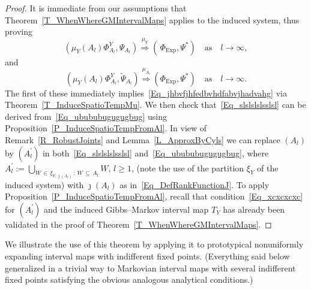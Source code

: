 \documentclass[AHL,Unicode,longabstracts]{cedram}
\newcommand{\Expl}{\mathrm{Exp}}
\begin{document}
\begin{proof}
It is immediate from our assumptions that Theorem~\ref{T_WhenWhereGMIntervalMaps} applies to the induced system, thus proving
\begin{equation}
\left(\mu_{Y}(A_{l})\Phi_{A_{l}}^{Y},\Psi_{A_{l}}\right)\overset{\mu_{Y}}{\Longrightarrow }\left(\,\Phi_{\Expl},\Psi^{\ast}\right)\quad\text{as}\quad  l\rightarrow\infty,
\end{equation}
and
\begin{equation}\label{Eq_ubububugugugbug}
\left(\mu_{Y}(A_{l})\Phi_{A_{l}}^{Y},\widetilde{\Psi}_{A_{l}}\right)\overset{\mu_{A_{l}}}{\Longrightarrow}\left(\Phi_{\Expl},\Psi^{\ast}\right)\quad\text{as}\quad  l\rightarrow\infty.
\end{equation}
The first of these immediately implies~\eqref{Eq_jhbvfjhfedbvhdfabvjhadvahg} via Theorem~\ref{T_InduceSpatioTempMu}. We then check that~\eqref{Eq_slslslslsslsl} can be derived from~\eqref{Eq_ubububugugugbug} using Proposition~\ref{P_InduceSpatioTempFromAl}. In view of Remark~\ref{R_RobustJoints} and Lemma~\ref{L_ApproxByCyls} we can replace $(A_{l})$ by $(A_{l}^{\prime})$ in both~\eqref{Eq_slslslslsslsl} and~\eqref{Eq_ubububugugugbug}, where $A_{l}^{\prime}:= {\textstyle\bigcup\nolimits_{W\,\in\,\xi_{Y,\jmath(A_{l})}\,:\,W\,\subseteq\,A_{l}}} W$, $l\geq1$, (note the use of the partition $\xi_{Y}$ of the induced system) with $\jmath(A_{l})$ as in~\eqref{Eq_DefRankFunctionJ}. To apply Proposition~\ref{P_InduceSpatioTempFromAl}, recall that condition~\eqref{Eq_xcxcxcxc} for $(A_{l}^{\prime})$ and the induced Gibbs--Markov interval map $T_{Y}$ has already been validated in the proof of Theorem~\ref{T_WhenWhereGMIntervalMaps}.
\end{proof}




We illustrate the use of this theorem by applying it to prototypical nonuniformly expanding interval maps with indifferent fixed points. (Everything said below generalized in a trivial way to Markovian interval maps with several indifferent fixed points satisfying the obvious analogous analytical conditions.)
\end{document}
